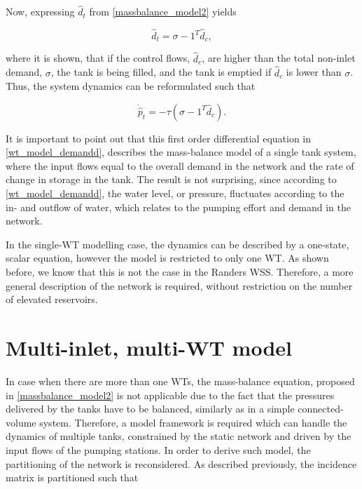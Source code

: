 Now, expressing $\hat{d}_t $ from \eqref{massbalance_model2} yields

\begin{equation}
\label{massbalance_model2_1}
\hat{d}_t  = \sigma - 1^T \hat{d}_c,
\end{equation}

where it is shown, that if the control flows, $\hat{d}_c$, are higher than the total non-inlet demand, $\sigma$, the tank is being filled, and the tank is emptied if $\hat{d}_c$ is lower than $\sigma$. Thus, the system dynamics can be reformulated such that

\begin{equation}
\label{wt_model_demandd}
\dot{\hat{p}}_t = -\tau (\sigma - 1^T \hat{d}_c).
\end{equation}

It is important to point out that this first order differential equation in \eqref{wt_model_demandd}, describes the mass-balance model of a single tank system, where the input flows equal to the overall demand in the network and the rate of change in storage in the tank. The result is not surprising, since according to \eqref{wt_model_demandd}, the water level, or pressure, fluctuates according to the in- and outflow of water, which relates to the pumping effort and demand in the network. 

In the single-WT modelling case, the dynamics can be described by a one-state, scalar equation, however the model is restricted to only one WT. As shown before, we know that this is not the case in the Randers WSS. Therefore, a more general description of the network is required, without restriction on the number of elevated reservoirs. 


\section{Multi-inlet, multi-WT model}
\label{multi_inlet_multi_WT_model}

In case when there are more than one WTs, the mass-balance equation, proposed in \eqref{massbalance_model2} is not applicable due to the fact that the pressures delivered by the tanks have to be balanced, similarly as in a simple connected-volume system. Therefore, a model framework is required which can handle the dynamics of multiple tanks, constrained by the static network and driven by the input flows of the pumping stations. In order to derive such model, the partitioning of the network is reconsidered. As described previously, the incidence matrix is partitioned such that 

